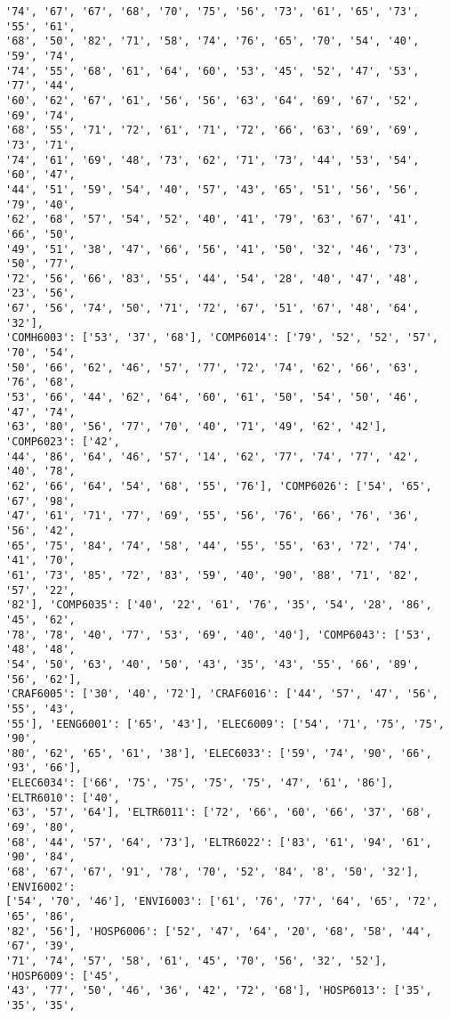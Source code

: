 \documentclass[11pt]{article}
\begin{document}
\begin{Verbatim}[commandchars=\\\{\}]
'74', '67', '67', '68', '70', '75', '56', '73', '61', '65', '73', '55', '61',
'68', '50', '82', '71', '58', '74', '76', '65', '70', '54', '40', '59', '74',
'74', '55', '68', '61', '64', '60', '53', '45', '52', '47', '53', '77', '44',
'60', '62', '67', '61', '56', '56', '63', '64', '69', '67', '52', '69', '74',
'68', '55', '71', '72', '61', '71', '72', '66', '63', '69', '69', '73', '71',
'74', '61', '69', '48', '73', '62', '71', '73', '44', '53', '54', '60', '47',
'44', '51', '59', '54', '40', '57', '43', '65', '51', '56', '56', '79', '40',
'62', '68', '57', '54', '52', '40', '41', '79', '63', '67', '41', '66', '50',
'49', '51', '38', '47', '66', '56', '41', '50', '32', '46', '73', '50', '77',
'72', '56', '66', '83', '55', '44', '54', '28', '40', '47', '48', '23', '56',
'67', '56', '74', '50', '71', '72', '67', '51', '67', '48', '64', '32'],
'COMH6003': ['53', '37', '68'], 'COMP6014': ['79', '52', '52', '57', '70', '54',
'50', '66', '62', '46', '57', '77', '72', '74', '62', '66', '63', '76', '68',
'53', '66', '44', '62', '64', '60', '61', '50', '54', '50', '46', '47', '74',
'63', '80', '56', '77', '70', '40', '71', '49', '62', '42'], 'COMP6023': ['42',
'44', '86', '64', '46', '57', '14', '62', '77', '74', '77', '42', '40', '78',
'62', '66', '64', '54', '68', '55', '76'], 'COMP6026': ['54', '65', '67', '98',
'47', '61', '71', '77', '69', '55', '56', '76', '66', '76', '36', '56', '42',
'65', '75', '84', '74', '58', '44', '55', '55', '63', '72', '74', '41', '70',
'61', '73', '85', '72', '83', '59', '40', '90', '88', '71', '82', '57', '22',
'82'], 'COMP6035': ['40', '22', '61', '76', '35', '54', '28', '86', '45', '62',
'78', '78', '40', '77', '53', '69', '40', '40'], 'COMP6043': ['53', '48', '48',
'54', '50', '63', '40', '50', '43', '35', '43', '55', '66', '89', '56', '62'],
'CRAF6005': ['30', '40', '72'], 'CRAF6016': ['44', '57', '47', '56', '55', '43',
'55'], 'EENG6001': ['65', '43'], 'ELEC6009': ['54', '71', '75', '75', '90',
'80', '62', '65', '61', '38'], 'ELEC6033': ['59', '74', '90', '66', '93', '66'],
'ELEC6034': ['66', '75', '75', '75', '75', '47', '61', '86'], 'ELTR6010': ['40',
'63', '57', '64'], 'ELTR6011': ['72', '66', '60', '66', '37', '68', '69', '80',
'68', '44', '57', '64', '73'], 'ELTR6022': ['83', '61', '94', '61', '90', '84',
'68', '67', '67', '91', '78', '70', '52', '84', '8', '50', '32'], 'ENVI6002':
['54', '70', '46'], 'ENVI6003': ['61', '76', '77', '64', '65', '72', '65', '86',
'82', '56'], 'HOSP6006': ['52', '47', '64', '20', '68', '58', '44', '67', '39',
'71', '74', '57', '58', '61', '45', '70', '56', '32', '52'], 'HOSP6009': ['45',
'43', '77', '50', '46', '36', '42', '72', '68'], 'HOSP6013': ['35', '35', '35',

\end{Verbatim}
\end{document}
